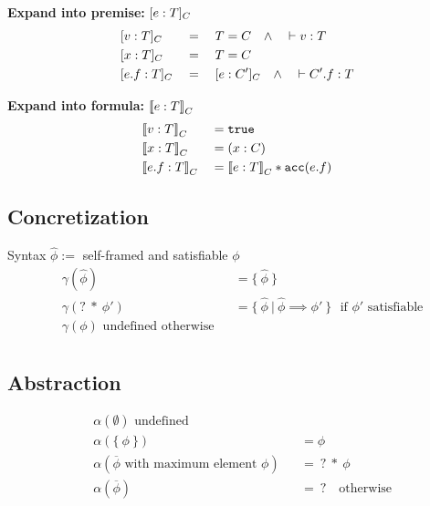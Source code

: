 \documentclass[11pt,a4paper]{article}
\begin{document}
\textbf{Expand into premise: } $[e : T]_{C}$
\begin{align*}
   &[v : T]_{C}   	&&=\quad T = C \quad\wedge\quad \vdash v : T
\\ &[x : T]_{C}   	&&=\quad T = C
\\ &[e.f : T]_{C}	&&=\quad [e : C']_{C} \quad\wedge\quad \vdash C'.f : T 
\end{align*}

\textbf{Expand into formula: } ${\llbracket e : T\rrbracket}_{C}$
\begin{align*}
   &{\llbracket v : T\rrbracket}_{C}   	&&= \texttt{true}
\\ &{\llbracket x : T\rrbracket}_{C}   	&&= (x : C)
\\ &{\llbracket e.f : T\rrbracket}_{C}	&&= {\llbracket e : T\rrbracket}_{C} * \texttt{acc}(e.f)
\end{align*}


\subsection{Concretization}
Syntax $\hat{\phi} := $ self-framed and satisfiable $\phi$
\begin{align*}
&\gamma(\hat{\phi}) ~&&= \{~ \hat{\phi} ~\} \\
&\gamma(?\:*\:\phi') ~&&= \{~ \hat{\phi} ~|~ \hat{\phi} \implies \phi' ~\} \text{~~if $\phi'$ satisfiable} \\
&\gamma(\phi) \text{ undefined otherwise} \\
\end{align*}

\subsection{Abstraction}
\begin{align*}
&\alpha(\emptyset) \text{ undefined} \\
&\alpha(\{~ \phi ~\}) &&= \phi \\
&\alpha(\overline{\phi} \text{ with maximum element } \phi) &&=~ ?\:*\:\phi \\
&\alpha(\overline{\phi}) &&=~ ? \text{~~~otherwise} \\
\end{align*}

\end{document}
